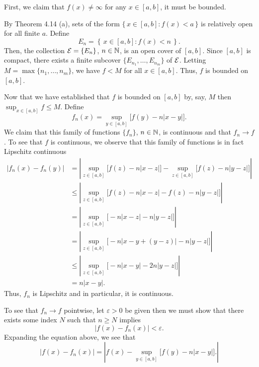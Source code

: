 \begin{solution}
  First, we claim that \(f(x)\neq\infty\) for any \(x\in[a,b]\), it must be
  bounded.
  \begin{subproof}
    By Theorem 4.14 (a), sets of the form \(\{\,x\in[a,b]:f(x)<a\,\}\) is
    relatively open for all finite \(a\). Define
    \[
      E_n=\left\{\,x\in [a,b]:f(x)<n\,\right\}.
    \]
    Then, the collection \(\mathcal{E}=\{E_n\}\), \(n\in\mathbb{N}\), is an open cover
    of \([a,b]\). Since \([a,b]\) is compact, there exists a finite
    subcover \(\{E_{n_1},\dotsc,E_{n_m}\}\) of \(\mathcal{E}\). Letting
    \(M=\max\{n_1,\dotsc,n_m\}\), we have \(f<M\) for all
    \(x\in[a,b]\). Thus, \(f\) is bounded on \([a,b]\).
  \end{subproof}\noindent
  Now that we have established that \(f\) is bounded on \([a,b]\) by, say,
  \(M\) then \(\sup_{x\in[a,b]} f\leq M\). Define
  \[
    f_n(x)=\sup_{y\in[a,b]}\bigl[f(y)-n|x-y|\bigr].
  \]
  We claim that this family of functions \(\{f_n\}\), \(n\in\mathbb{N}\), is
  continuous and that \(f_n\to f\). To see that \(f\) is continuous, we
  observe that this family of functions is in fact Lipschitz continuous
  \begin{align*}
    |f_n(x)-f_n(y)|
    &=\left|\sup_{z\in[a,b]}\bigl[ f(z)-n|x-z|
      \bigr]-\sup_{z\in[a,b]}\bigl[ f(z)-n|y-z| \bigr]\right|\\
    &\leq\left|\sup_{z\in[a,b]}\bigl[ f(z)-n|x-z|-f(z)-n|y-z| \bigr]\right|\\
    &=\left|\sup_{z\in[a,b]}\bigl[-n|x-z|-n|y-z|\bigr]\right|\\
    &=\left|\sup_{z\in[a,b]}\bigl[-n|x-y+(y-z)|-n|y-z|\bigr]\right|\\
    &\leq\left|\sup_{z\in[a,b]}\bigl[-n|x-y|-2n|y-z|\bigr]\right|\\
    &=n|x-y|.
  \end{align*}
  Thus, \(f_n\) is Lipschitz and in particular, it is continuous.

  To see that \(f_n\to f\) pointwise, let \(\varepsilon>0\) be given then
  we must show that there exists some index \(N\) such that \(n\geq N\)
  implies
  \[
    |f(x)-f_n(x)|<\varepsilon.
  \]
  Expanding the equation above, we see that
  \[
    |f(x)-f_n(x)|=
    \left|
      f(x)-\sup_{y\in[a,b]}\bigl[f(y)-n|x-y|\bigr].
    \right|
  \]
\end{solution}

